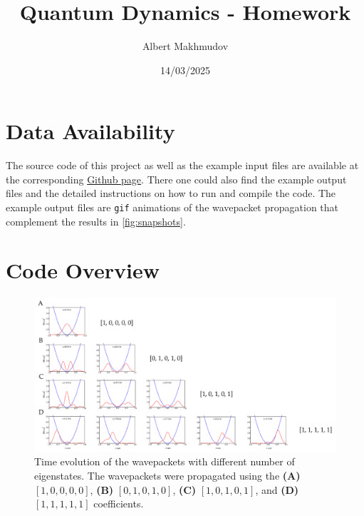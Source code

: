 \documentclass[12pt]{article}
\title{Quantum Dynamics - Homework}
\author{Albert Makhmudov}
\date{14/03/2025}
\begin{document}
\maketitle

\section*{Data Availability}
The source code of this project as well as the example input files are available at the corresponding \href{https://github.com/almakhmudov/LTTC-Homework--QD}{Github page}. There one could also find the example output files and the detailed instructions on how to run and compile the code. The example output files are \texttt{gif} animations of the wavepacket propagation that complement the results in \autoref{fig:snapshots}.

\section*{Code Overview}


\begin{figure}
    \includegraphics[width=\textwidth]{snapshots.pdf}
    \caption{Time evolution of the wavepackets with different number of eigenstates. The wavepackets were propagated using the \textbf{(A)} $[1, 0, 0, 0, 0]$, \textbf{(B)} $[0, 1, 0, 1, 0]$, \textbf{(C)} $[1, 0, 1, 0, 1]$, and \textbf{(D)} $[1, 1, 1, 1, 1]$ coefficients.}
    \label{fig:snapshots}
\end{figure}
\end{document}

